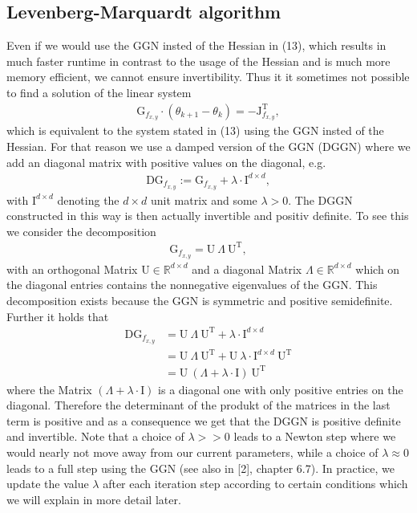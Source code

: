 \documentclass[conference]{IEEEtran}
\begin{document}
\subsection{Levenberg-Marquardt algorithm }
Even if we would use the GGN insted of the Hessian in (13), which results in much faster runtime in contrast to the usage of the Hessian and is much more memory efficient, we cannot ensure invertibility. Thus it it sometimes not possible to find a solution of the linear system
\begin{align}
\mathrm{G}_{f_{x, y}}\cdot(\theta_{k+1} - \theta_{k}) = -\mathrm{J}_{f_{x, y}}^{\mathrm{T}},
\end{align}
which is equivalent to the system stated in (13) using the GGN insted of the Hessian.
For that reason we use a damped version of the GGN (DGGN) where we add an diagonal matrix with positive values on the diagonal, e.g.
\begin{align}
\mathrm{DG}_{f_{x, y}} := \mathrm{G}_{f_{x, y}} + \lambda\cdot\mathrm{I}^{d\times d},
\end{align}
with $\mathrm{I}^{d\times d}$ denoting the $d\times d$ unit matrix and some $\lambda>0$.
The DGGN constructed in this way is then actually invertible and positiv definite. 
To see this we consider the decomposition
\begin{align}
\mathrm{G}_{f_{x, y}} = \mathrm{U}\:\Lambda\:\mathrm{U}^{\mathrm{T}},
\end{align}
with an orthogonal Matrix $\mathrm{U}\in\mathbb{R}^{d\times d}$ and a diagonal Matrix $\Lambda\in\mathbb{R}^{d\times d}$ which on the diagonal entries contains the nonnegative eigenvalues of the GGN. This decomposition exists because the GGN is symmetric and positive semidefinite. Further it holds that
\begin{align}
\mathrm{DG}_{f_{x, y}} &= \mathrm{U}\:\Lambda\:\mathrm{U}^{\mathrm{T}} + \lambda\cdot\mathrm{I}^{d\times d}\\
&= \mathrm{U}\:\Lambda\:\mathrm{U}^{\mathrm{T}} + \mathrm{U}\:\lambda\cdot\mathrm{I}^{d\times d}\:\mathrm{U}^{\mathrm{T}}\\
&= \mathrm{U}\:\left(\Lambda + \lambda\cdot\mathrm{I}\right)\:\mathrm{U}^{\mathrm{T}}
\end{align}
where the Matrix $\left(\Lambda + \lambda\cdot\mathrm{I}\right)$ is a diagonal one with only positive entries on the diagonal. Therefore the determinant of the produkt of the matrices in the last term is positive and as a consequence we get that the DGGN is positive definite and invertible.
Note that a choice of $\lambda>>0$ leads to a Newton step where we would nearly not move away from our current parameters, while a choice of $\lambda\approx 0$ leads to a full step using the GGN (see also in [2], chapter 6.7). In practice, we update the value $\lambda$ after each iteration step according to certain conditions which we will explain in more detail later.
\end{document}
